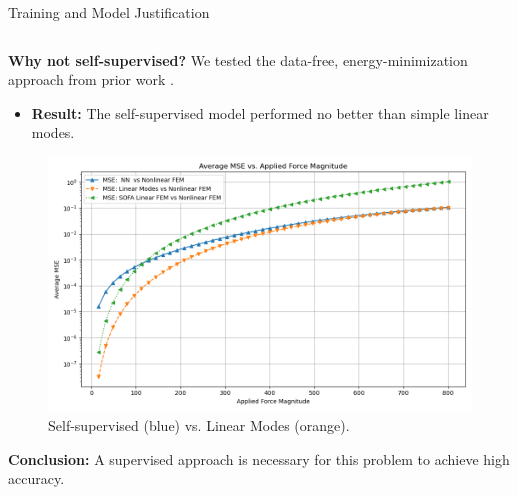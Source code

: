 \documentclass{beamer}
\begin{document}
\begin{frame}{Training and Model Justification}
\begin{columns}[T]
        \begin{column}{0.5\textwidth}
            \textbf{Why not self-supervised?}
            We tested the data-free, energy-minimization approach from prior work \cite{Wang_Du_Coros_Thomaszewski_2024}.
            \begin{itemize}
                \item \textbf{Result:} The self-supervised model performed no better than simple linear modes.
            \end{itemize}
            \begin{figure}
                \includegraphics[width=\textwidth]{Images/self_supervised_mse.png}
                \caption{Self-supervised (blue) vs. Linear Modes (orange).}
            \end{figure}
            \textbf{Conclusion:} A supervised approach is necessary for this problem to achieve high accuracy.
        \end{column}
    \end{columns}
\end{frame}
\end{document}
